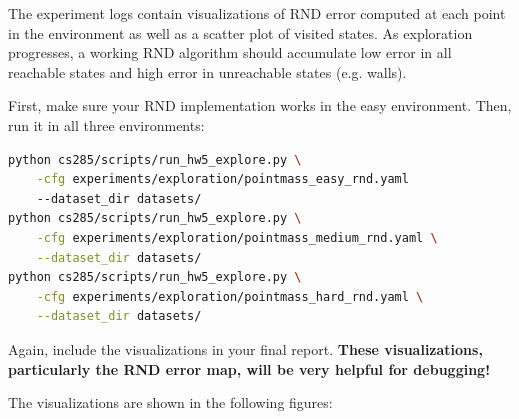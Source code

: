 \documentclass{article}
\begin{document}
The experiment logs contain visualizations of RND error computed at each point in the environment as well as a scatter plot of visited states. As exploration progresses, a working RND algorithm should accumulate low error in all reachable states and high error in unreachable states (e.g. walls).

First, make sure your RND implementation works in the easy environment. Then, run it in all three environments:
\begin{lstlisting}[language=bash]
python cs285/scripts/run_hw5_explore.py \
    -cfg experiments/exploration/pointmass_easy_rnd.yaml
    --dataset_dir datasets/
python cs285/scripts/run_hw5_explore.py \
    -cfg experiments/exploration/pointmass_medium_rnd.yaml \
    --dataset_dir datasets/
python cs285/scripts/run_hw5_explore.py \
    -cfg experiments/exploration/pointmass_hard_rnd.yaml \
    --dataset_dir datasets/
\end{lstlisting}

Again, include the visualizations in your final report. \textbf{These visualizations, particularly the RND error map, will be very helpful for debugging!}

\MYSOLUTION The visualizations are shown in the following figures: 

\end{document}
